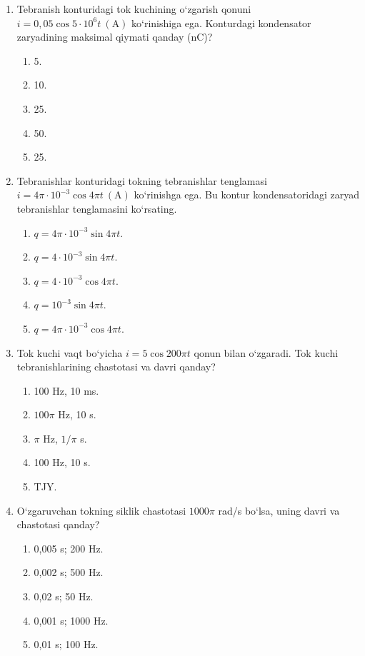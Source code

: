 \begin{enumerate}
\item Tebranish konturidagi tok kuchining o‘zgarish qonuni $i=0,05\cos5\cdot10^6 t \ (\text{A})$ ko‘rinishiga ega. Konturdagi kondensator zaryadining maksimal qiymati qanday (nC)?
\begin{enumerate}[label=\Alph*)]
\item 5.
\item 10.
\item 25.
\item 50.
\item 25.
\end{enumerate}

\item Tebranishlar konturidagi tokning tebranishlar tenglamasi $i=4\pi\cdot10^{-3}\cos4\pi t \ (\text{A})$ ko‘rinishga ega. Bu kontur kondensatoridagi zaryad tebranishlar tenglamasini ko‘rsating.
\begin{enumerate}[label=\Alph*)]
\item $q=4\pi\cdot10^{-3}\sin4\pi t$.
\item $q=4\cdot10^{-3}\sin4\pi t$.
\item $q=4\cdot10^{-3}\cos4\pi t$.
\item $q=10^{-3}\sin4\pi t$.
\item $q=4\pi\cdot10^{-3}\cos4\pi t$.
\end{enumerate}

\item Tok kuchi vaqt bo‘yicha $i=5\cos200\pi t$ qonun bilan o‘zgaradi. Tok kuchi tebranishlarining chastotasi va davri qanday?
\begin{enumerate}[label=\Alph*)]
\item 100 Hz, 10 ms.
\item $100\pi$ Hz, 10 s.
\item $\pi$ Hz, $1/\pi$ s.
\item 100 Hz, 10 s.
\item TJY.
\end{enumerate}

\item O‘zgaruvchan tokning siklik chastotasi $1000\pi$ rad/s bo‘lsa, uning davri va chastotasi qanday?
\begin{enumerate}[label=\Alph*)]
\item 0,005 s; 200 Hz.
\item 0,002 s; 500 Hz.
\item 0,02 s; 50 Hz.
\item 0,001 s; 1000 Hz.
\item 0,01 s; 100 Hz.
\end{enumerate}


\end{enumerate}
